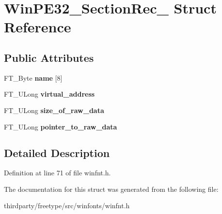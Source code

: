 \hypertarget{struct_win_p_e32___section_rec__}{}\section{Win\+P\+E32\+\_\+\+Section\+Rec\+\_\+ Struct Reference}
\label{struct_win_p_e32___section_rec__}
\subsection*{Public Attributes}
\begin{DoxyCompactItemize}
\item 
\mbox{\label{struct_win_p_e32___section_rec___ad47502ee4359569e58c352d0dbcf1712}} 
F\+T\+\_\+\+Byte {\bfseries name} \mbox{[}8\mbox{]}
\item 
\mbox{\label{struct_win_p_e32___section_rec___a01e47fce84a3295e082bc5aed4762559}} 
F\+T\+\_\+\+U\+Long {\bfseries virtual\+\_\+address}
\item 
\mbox{\label{struct_win_p_e32___section_rec___a47d5e15bdbe2d8e43f96f67c68e96662}} 
F\+T\+\_\+\+U\+Long {\bfseries size\+\_\+of\+\_\+raw\+\_\+data}
\item 
\mbox{\label{struct_win_p_e32___section_rec___aa9b7b13155129ada998736789c5ef4ac}} 
F\+T\+\_\+\+U\+Long {\bfseries pointer\+\_\+to\+\_\+raw\+\_\+data}
\end{DoxyCompactItemize}


\subsection{Detailed Description}


Definition at line 71 of file winfnt.\+h.



The documentation for this struct was generated from the following file\+:\begin{DoxyCompactItemize}
\item 
thirdparty/freetype/src/winfonts/winfnt.\+h\end{DoxyCompactItemize}
